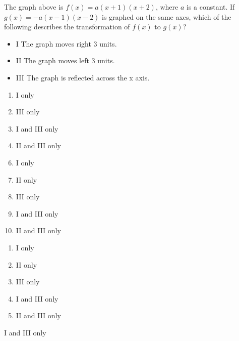 
The graph above is $f(x) = a(x + 1)(x + 2)$, where $a$
is a constant.  If $g(x) = -a(x - 1)(x - 2)$ is
graphed on the same axes, which of the following
describes the transformation of $f(x)$ to $g(x)$?
\begin{itemize}
\item I   The graph moves right 3 units.
\item II  The graph moves left 3 units.
\item III The graph is reflected across the x axis.
\end{itemize}


\ifsat
	\begin{enumerate}[label=\Alph*)]
		\item I only
		\item III only
		\item I and III only%
		\item II and III only
	\end{enumerate}
\else
\fi

\ifacteven
	\begin{enumerate}[label=\textbf{\Alph*.},itemsep=\fill,align=left]
		\setcounter{enumii}{5}
		\item I only
		\item II only
		\item III only
		\addtocounter{enumii}{1}
		\item I and III only%
		\item II and III only
	\end{enumerate}
\else
\fi

\ifactodd
	\begin{enumerate}[label=\textbf{\Alph*.},itemsep=\fill,align=left]
		\item I only
		\item II only
		\item III only
		\item I and III only%
		\item II and III only
	\end{enumerate}
\else
\fi

\ifgridin
 I and III only%
		
\else
\fi

